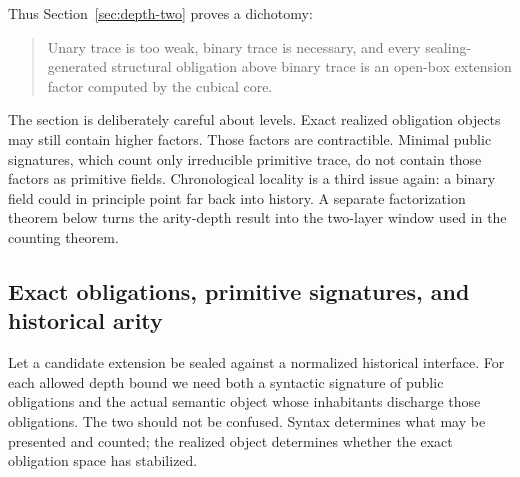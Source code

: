 \documentclass{lmcs}
\begin{document}
Thus Section~\ref{sec:depth-two} proves a dichotomy:
\begin{quote}
Unary trace is too weak, binary trace is necessary, and every sealing-generated structural
obligation above binary trace is an open-box extension factor computed by the cubical core.
\end{quote}

The section is deliberately careful about levels.  Exact realized obligation objects may
still contain higher factors.  Those factors are contractible.  Minimal public signatures,
which count only irreducible primitive trace, do not contain those factors as primitive
fields.  Chronological locality is a third issue again: a binary field could in principle point
far back into history.  A separate factorization theorem below turns the arity-depth result
into the two-layer window used in the counting theorem.

\subsection{Exact obligations, primitive signatures, and historical arity}
\label{subsec:obligation-objects}

Let a candidate extension be sealed against a normalized historical interface.  For each
allowed depth bound we need both a syntactic signature of public obligations and the actual
semantic object whose inhabitants discharge those obligations.  The two should not be
confused.  Syntax determines what may be presented and counted; the realized object
determines whether the exact obligation space has stabilized.
\end{document}
